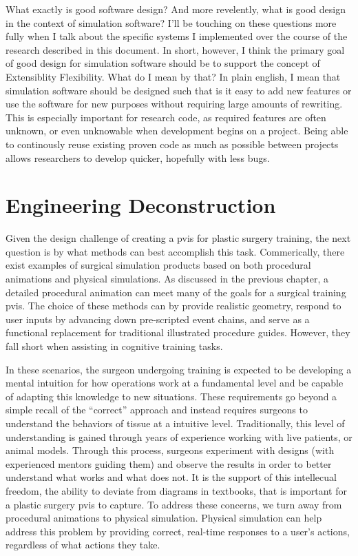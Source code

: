 \documentclass[12pt,oneside,letterpaper]{memoir}
\begin{document}
What exactly is good software design? And more revelently, what is
good design in the context of simulation software? I'll be touching on
these questions more fully when I talk about the specific systems
I implemented over the course of the research described in this
document. In short, however, I think the primary goal of good design
for simulation software should be to support the concept of
Extensiblity Flexibility. What do I mean by that? In plain english, I
mean that simulation software should be designed such that is it easy
to add new features or use the software for new purposes without
requiring large amounts of rewriting. This is especially important for
research code, as required features are often unknown, or even
unknowable when development begins on a project. Being able to
continously reuse existing proven code as much as possible between projects
allows researchers to develop quicker, hopefully with less bugs.



\chapter{Engineering Deconstruction}

Given the design challenge of creating a \acrlong{pvis} for plastic
surgery training, the next question is by what methods can best
accomplish this task. Commerically, there exist examples of surgical
simulation products based on both procedural animations and physical
simulations. As discussed in the previous chapter, a detailed
procedural animation can meet many of the goals for a surgical
training \gls{pvis}. The choice of these methods can by provide realistic geometry,
respond to user inputs by advancing down pre-scripted event chains,
and serve as a functional replacement for traditional illustrated
procedure guides. However, they fall short when assisting in cognitive training
tasks.

In these scenarios, the surgeon undergoing training is expected to be
developing a mental intuition for how operations work at a fundamental
level and be capable of adapting this knowledge to new
situations. These requirements go beyond a simple recall of the
``correct'' approach and instead requires surgeons to understand the
behaviors of tissue at a intuitive level. Traditionally, this level of
understanding is gained through years of experience working with live
patients, or animal models. Through this process, surgeons experiment
with designs (with experienced mentors guiding them) and observe the
results in order to better understand what works and what does not. It
is the support of this intellecual freedom, the ability to deviate
from diagrams in textbooks, that is important for a plastic surgery
\gls{pvis} to capture. To address these concerns, we turn away from
procedural animations to physical simulation. Physical simulation can
help address this problem by providing correct, real-time responses to
a user's actions, regardless of what actions they take.
\end{document}
